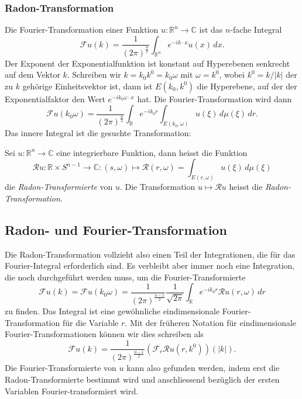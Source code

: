 %
%
\subsubsection{Radon-Transformation}
Die Fourier-Transformation einer Funktion $u\colon \mathbb{R}^n\to\mathbb{C}$
ist das $n$-fache Integral
\[
\mathscr{F}u(k)
=
\frac{1}{(2\pi)^{\frac{n}2}}
\int_{\mathbb{R}^n}
e^{-ik\cdot x} u(x)\,dx.
\]
Der Exponent der Exponentialfunktion ist konstant auf Hyperebenen senkrecht
auf dem Vektor $k$.
Schreiben wir $k=k_0k^0=k_0\omega$ mit $\omega=k^0$, wobei $k^0=k/|k|$ der
zu $k$ gehörige Einheitsvektor ist, dann ist 
$E(k_0,k^0)$ die Hyperebene, auf der der Exponentialfaktor den
Wert $e^{-ik_0\omega\cdot x}$ hat.
Die Fourier-Transformation wird dann
\[
\mathscr{F}u(k_0\omega)
=
\frac{1}{(2\pi)^{\frac{n}2}}
\int_{\mathbb{R}}
e^{-ik_0r}
\int_{E(k_0,\omega)}
u(\xi)
\,d\mu(\xi)
\,dr.
\]
Das innere Integral ist die gesuchte Transformation:

\begin{definition}
Sei $u\colon\mathbb{R}^n\to\mathbb{C}$ eine integrierbare Funktion,
dann heisst die Funktion
\[
\mathscr{R}u
\colon
\mathbb{R}\times S^{n-1}
\to
\mathbb{C}
:
(s,\omega)
\mapsto
\mathscr{R}(r,\omega)
=
\int_{E(r,\omega)} u(\xi) \,d\mu(\xi)
\]
die {\em Radon-Transformierte} von $u$.
%
Die Transformation $u\mapsto \mathscr{R}u$ heisst die
{\em Radon-Transformation}.
%
\end{definition}

%
%
\subsection{Radon- und Fourier-Transformation
\label{buch:radon:definition:subsection:radonfourier}}
Die Radon-Transformation vollzieht also einen Teil der Integrationen,
die für das Fourier-Integral erforderlich sind.
Es verbleibt aber immer noch eine Integration, die noch
durchgeführt werden muss, um die Fourier-Transformierte
\[
\mathscr{F}u(k)
=
\mathscr{F}u(k_0\omega)
=
\frac{1}{(2\pi)^{\frac{n-1}2}}
\frac{1}{\sqrt{2\pi}}
\int_{\mathbb{R}}
e^{-ik_0r}
\mathscr{R}u(r,\omega)\,dr
\]
zu finden.
Das Integral ist eine gewöhnliche eindimensionale Fourier-Transformation
für die Variable $r$.
Mit der früheren Notation für eindimensionale Fourier-Transformationen
können wir dies schreiben als
\begin{equation}
\mathscr{F}u(k)
=
\frac{1}{(2\pi)^{\frac{n-1}2}}
(\mathscr{F}_r \mathscr{R}u(r,k^0))(|k|).
\label{buch:radon:definitionb:eqn:fr}
\end{equation}
Die Fourier-Transformierte von $u$ kann also gefunden werden,
indem erst die Radon-Transformierte bestimmt wird und anschliessend
bezüglich der ersten Variablen Fourier-transformiert wird.

